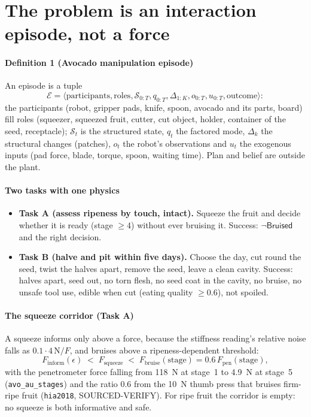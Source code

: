 \documentclass[10.5pt,a4paper]{article}
\begin{document}
\section{The problem is an interaction episode, not a force}
\paragraph{Definition 1 (Avocado manipulation episode)} An episode is a tuple
\[\mathcal{E}=\langle\text{participants},\text{roles},\mathcal{S}_{0:T},q_{0:T},\Delta_{1:K},o_{0:T},u_{0:T},
\text{outcome}\rangle:\]
the participants (robot, gripper pads, knife, spoon, avocado and its parts, board) fill roles
(squeezer, squeezed fruit, cutter, cut object, holder, container of the seed, receptacle); $\mathcal{S}_t$ is the
structured state, $q_t$ the factored mode, $\Delta_k$ the structural changes (patches), $o_t$ the robot's observations
and $u_t$ the exogenous inputs (pad force, blade, torque, spoon, waiting time). Plan and belief are outside the plant.

\paragraph{Two tasks with one physics}
\begin{itemize}
\item \textbf{Task A (assess ripeness by touch, intact).} Squeeze the fruit and decide whether it is ready
(stage $\ge 4$) without ever bruising it. Success: $\neg\mathsf{Bruised}$ and the right decision.
\item \textbf{Task B (halve and pit within five days).} Choose the day, cut round the seed, twist the halves apart,
remove the seed, leave a clean cavity. Success: halves apart, seed out, no torn flesh, no seed coat in the cavity, no
bruise, no unsafe tool use, edible when cut (eating quality $\ge 0.6$), not spoiled.
\end{itemize}

\paragraph{The squeeze corridor (Task A)} A squeeze informs only above a force, because the stiffness reading's
relative noise falls as $0.1\cdot4\,\mathrm{N}/F$, and bruises above a ripeness-dependent threshold:
\begin{equation}
F_\text{inform}(\epsilon) \;<\; F_\text{squeeze} \;<\; F_\text{bruise}(\text{stage}) = 0.6\,F_\text{pen}(\text{stage}),
\label{eq:corridor}\end{equation}
with the penetrometer force falling from 118~N at stage~1 to 4.9~N at stage~5 (\texttt{avo\_au\_stages}) and the
ratio 0.6 from the 10~N thumb press that bruises firm-ripe fruit (\texttt{hia2018}, SOURCED-VERIFY). For ripe fruit
the corridor is empty: no squeeze is both informative and safe.
\end{document}
